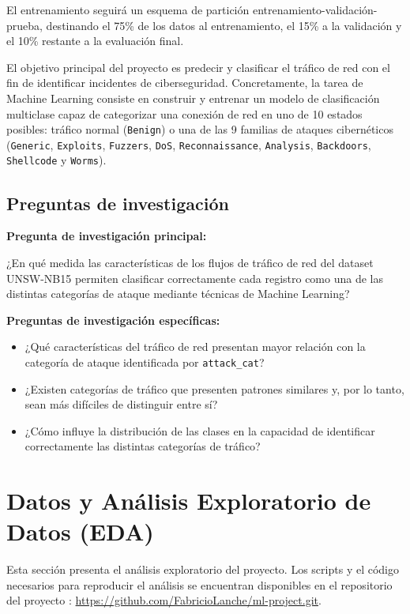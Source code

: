 \documentclass[conference]{IEEEtran}
\begin{document}
El entrenamiento seguirá un esquema de partición entrenamiento-validación-prueba, destinando el 75\% de los datos al entrenamiento, el 15\% a la validación y el 10\% restante a la evaluación final.

El objetivo principal del proyecto es predecir y clasificar el tráfico de red con el fin de identificar incidentes de ciberseguridad. Concretamente, la tarea de Machine Learning consiste en construir y entrenar un modelo de clasificación multiclase capaz de categorizar una conexión de red en uno de 10 estados posibles: tráfico normal (\texttt{Benign}) o una de las 9 familias de ataques cibernéticos  (\texttt{Generic}, \texttt{Exploits}, \texttt{Fuzzers}, \texttt{DoS}, \texttt{Reconnaissance}, \texttt{Analysis}, \texttt{Backdoors}, \texttt{Shellcode} y \texttt{Worms}).


\subsection{Preguntas de investigación}

\textbf{Pregunta de investigación principal:}

¿En qué medida las características de los flujos de tráfico de red del dataset UNSW-NB15 permiten clasificar correctamente cada registro como una de las distintas categorías de ataque mediante técnicas de Machine Learning?

\textbf{Preguntas de investigación específicas:}

\begin{itemize}
    \item ¿Qué características del tráfico de red presentan mayor relación con la categoría de ataque identificada por \texttt{attack\_cat}?
    
    \item ¿Existen categorías de tráfico que presenten patrones similares y, por lo tanto, sean más difíciles de distinguir entre sí?
    
    \item ¿Cómo influye la distribución de las clases en la capacidad de identificar correctamente las distintas categorías de tráfico?
\end{itemize}
\FloatBarrier

\section{Datos y Análisis Exploratorio de Datos (EDA)}

Esta sección presenta el análisis exploratorio del proyecto. Los scripts y el código necesarios para reproducir el análisis se encuentran disponibles en el repositorio del proyecto \cite{repo}: \url{https://github.com/FabricioLanche/ml-project.git}.
\end{document}
